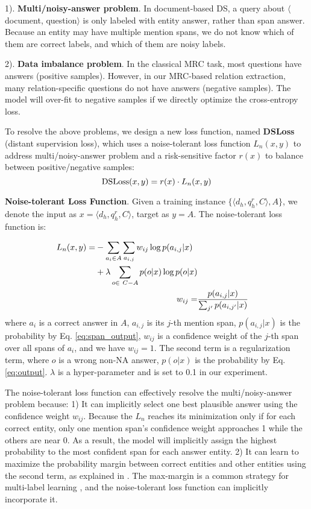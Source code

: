 \documentclass[11pt,a4paper]{article}
\begin{document}
  1). \textbf{Multi/noisy-answer problem}. In document-based DS, a query about $\langle$document, question$\rangle$ is only labeled with entity answer, rather than span answer. Because an entity may have multiple mention spans, we do not know which of them are correct labels, and which of them are noisy labels. 
  
  2). \textbf{Data imbalance problem}. In the classical MRC task, most questions have answers (positive samples). However,  in our MRC-based relation extraction, many relation-specific questions do not have answers (negative samples). The model will over-fit to negative samples if we directly optimize the cross-entropy loss.
  
  To resolve the above problems, we design a new loss function, named \textbf{DSLoss} (distant supervision loss), which uses a noise-tolerant loss function $L_n(x, y)$ to address multi/noisy-answer problem and a risk-sensitive factor $r(x)$ to balance between positive/negative samples:
  \begin{equation}
    {\rm DSLoss}(x, y) = r(x) \cdot
    L_n(x, y)
  \end{equation}
  
  \textbf{Noise-tolerant Loss Function}.
  Given a training instance $\{\langle d_h, q_h^r, C\rangle, A\}$, we denote the input as $x=\langle d_h, q_h^r, C\rangle$, target as $y=A$. The noise-tolerant loss function is:
  
  \begin{align}
    \setlength{\abovedisplayskip}{-4em}
    \begin{split}
       L_n(x, y) = &- \sum_{a_i \in A} \sum_{a_{i,j}}w_{ij}\log p(a_{i,j}|x) \\
      &+\lambda\sum_{o \in\ C-A} p(o|x) \log p(o|x)
    \end{split}\\
    w_{ij} =& \frac{p(a_{i,j}|x)}{\sum_{j'}p(a_{i,j'}|x)}
    \label{eq:noise-tolerant}
  \end{align}
  \noindent where $a_i$ is a correct answer in $A$, $a_{i,j}$ is its $j$-th mention span, $p(a_{i,j}|x)$ is the probability by Eq. \ref{eq:span_output}, $w_{ij}$ is a confidence weight of the $j$-th span over all spans of $a_i$, and we have $w_{ij} = 1$.
  The second term is a regularization term, where $o$ is a wrong non-NA answer, $p(o|x)$ is the probability by Eq. \ref{eq:output}. $\lambda$ is a hyper-parameter and is set to 0.1 in our experiment.
  
  The noise-tolerant loss function can effectively resolve the multi/noisy-answer problem because:
  1) It can implicitly select one best plausible answer using the confidence weight $w_{ij}$.
  Because the $L_n$ reaches its minimization only if for each correct entity, only one mention span's confidence weight approaches 1 while the others are near 0.
  As a result, the model will implicitly assign the highest probability to the most confident span for each answer entity.
  2) It can learn to maximize the probability margin between correct entities and other entities using the second term, as explained in \citet{lin_cost_2019}.
  The max-margin is a common strategy for multi-label learning \cite{taskar_max_2004, ye_deep_2019}, and the noise-tolerant loss function can implicitly incorporate it.
  
\end{document}
